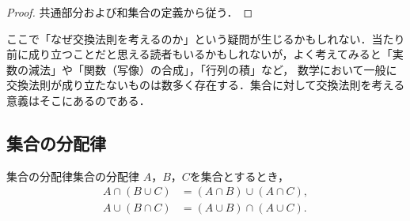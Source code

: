 \begin{tleftbar}
  \begin{proof}
    共通部分および和集合の定義から従う．
  \end{proof}
\end{tleftbar}

\begin{mycolumn}
  ここで「なぜ交換法則を考えるのか」という疑問が生じるかもしれない．当たり前に成り立つことだと思える読者もいるかもしれないが，よく考えてみると「実数の減法」や「関数（写像）の合成」，「行列の積」など，
  数学において一般に交換法則が成り立たないものは数多く存在する．集合に対して交換法則を考える意義はそこにあるのである．
\end{mycolumn}

\subsection{集合の分配律}

\begin{prop}{集合の分配律}{集合の分配律}
  $A$，$B$，$C$を集合とするとき，
  \begin{align*}
    A \cap ( B \cup C) & = (A \cap B) \cup (A \cap C), \\
    A \cup ( B \cap C) & = (A \cup B) \cap (A \cup C).
  \end{align*}
\end{prop}

